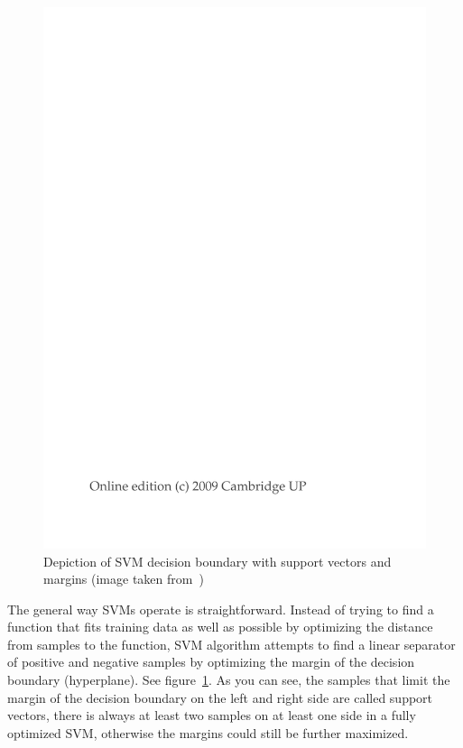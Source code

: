 \begin{figure}[htbp]
    \centering
        \includegraphics[page=3,trim=5.5cm 16cm 4cm 6.5cm,clip,width=\textwidth]{./images/external/intro-ir-svm.pdf}
    \caption{Depiction of SVM decision boundary with support vectors and margins (image taken from~\cite{manning2008introduction})}
    \label{fig:background.svm.decision.intro}
\end{figure}

The general way SVMs operate is straightforward. Instead of trying to find a function that fits training data as well as possible by optimizing the distance from samples to the function, SVM algorithm attempts to find a linear separator of positive and negative samples by optimizing the margin of the decision boundary (hyperplane). See figure~\ref{fig:background.svm.decision.intro}. As you can see, the samples that limit the margin of the decision boundary on the left and right side are called support vectors, there is always at least two samples on at least one side in a fully optimized SVM, otherwise the margins could still be further maximized.

